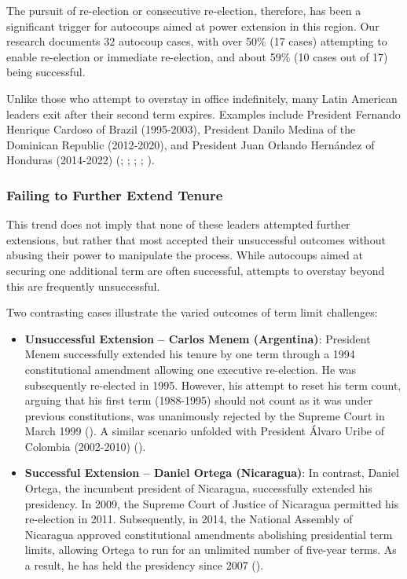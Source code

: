 \documentclass[
  12pt,
]{report}
\begin{document}
The pursuit of re-election or consecutive re-election, therefore, has
been a significant trigger for autocoups aimed at power extension in
this region. Our research documents 32 autocoup cases, with over 50\%
(17 cases) attempting to enable re-election or immediate re-election,
and about 59\% (10 cases out of 17) being successful.

Unlike those who attempt to overstay in office indefinitely, many Latin
American leaders exit after their second term expires. Examples include
President Fernando Henrique Cardoso of Brazil (1995-2003), President
Danilo Medina of the Dominican Republic (2012-2020), and President Juan
Orlando Hernández of Honduras (2014-2022)
(;
;
;
; ).

\subsubsection*{Failing to Further Extend
Tenure}\label{failing-to-further-extend-tenure}

This trend does not imply that none of these leaders attempted further
extensions, but rather that most accepted their unsuccessful outcomes
without abusing their power to manipulate the process. While autocoups
aimed at securing one additional term are often successful, attempts to
overstay beyond this are frequently unsuccessful.

Two contrasting cases illustrate the varied outcomes of term limit
challenges:

\begin{itemize}
\item
  \textbf{Unsuccessful Extension -- Carlos Menem (Argentina)}: President
  Menem successfully extended his tenure by one term through a 1994
  constitutional amendment allowing one executive re-election. He was
  subsequently re-elected in 1995. However, his attempt to reset his
  term count, arguing that his first term (1988-1995) should not count
  as it was under previous constitutions, was unanimously rejected by
  the Supreme Court in March 1999 (). A similar scenario unfolded with President Álvaro Uribe of
  Colombia (2002-2010) ().
\item
  \textbf{Successful Extension -- Daniel Ortega (Nicaragua)}: In
  contrast, Daniel Ortega, the incumbent president of Nicaragua,
  successfully extended his presidency. In 2009, the Supreme Court of
  Justice of Nicaragua permitted his re-election in 2011. Subsequently,
  in 2014, the National Assembly of Nicaragua approved constitutional
  amendments abolishing presidential term limits, allowing Ortega to run
  for an unlimited number of five-year terms. As a result, he has held
  the presidency since 2007 ().
\end{itemize}
\end{document}
